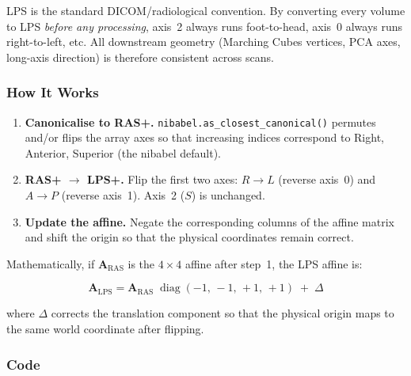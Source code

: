 \documentclass[12pt,a4paper]{article}
\begin{document}
LPS is the standard DICOM/radiological convention.  By converting every volume
to LPS \emph{before any processing}, axis~2 always runs foot-to-head, axis~0
always runs right-to-left, etc.  All downstream geometry (Marching Cubes
vertices, PCA axes, long-axis direction) is therefore consistent across scans.

\subsubsection{How It Works}

\begin{enumerate}
    \item \textbf{Canonicalise to RAS+.}  \texttt{nibabel.as\_closest\_canonical()}
          permutes and/or flips the array axes so that increasing indices
          correspond to Right, Anterior, Superior (the nibabel default).
    \item \textbf{RAS+ $\to$ LPS+.}  Flip the first two axes:
          $R \to L$ (reverse axis~0) and $A \to P$ (reverse axis~1).  Axis~2
          ($S$) is unchanged.
    \item \textbf{Update the affine.}  Negate the corresponding columns of the
          affine matrix and shift the origin so that the physical coordinates
          remain correct.
\end{enumerate}

Mathematically, if $\mathbf{A}_{\text{RAS}}$ is the $4 \times 4$ affine after
step~1, the LPS affine is:

\begin{equation}
    \boxed{
        \mathbf{A}_{\text{LPS}} =
        \mathbf{A}_{\text{RAS}} \;
        \operatorname{diag}(-1,\,-1,\,+1,\,+1)
        \; + \; \Delta
    }
    \label{eq:lps_affine}
\end{equation}

where $\Delta$ corrects the translation component so that the physical origin
maps to the same world coordinate after flipping.

\subsubsection{Code}
\end{document}
